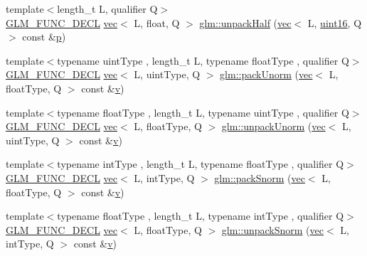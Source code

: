 \begin{DoxyCompactItemize}
\item 
{\footnotesize template$<$length\+\_\+t L, qualifier Q$>$ }\\\hyperlink{setup_8hpp_ab2d052de21a70539923e9bcbf6e83a51}{G\+L\+M\+\_\+\+F\+U\+N\+C\+\_\+\+D\+E\+CL} \hyperlink{structglm_1_1vec}{vec}$<$ L, float, Q $>$ \hyperlink{group__gtc__packing_ga30d6b2f1806315bcd6047131f547d33b}{glm\+::unpack\+Half} (\hyperlink{structglm_1_1vec}{vec}$<$ L, \hyperlink{group__gtc__type__precision_gad8c2939e1fdd8e5828b31d95c52255d5}{uint16}, Q $>$ const \&\hyperlink{_s_d_l__opengl__glext_8h_aa5367c14d90f462230c2611b81b41d23}{p})
\item 
{\footnotesize template$<$typename uint\+Type , length\+\_\+t L, typename float\+Type , qualifier Q$>$ }\\\hyperlink{setup_8hpp_ab2d052de21a70539923e9bcbf6e83a51}{G\+L\+M\+\_\+\+F\+U\+N\+C\+\_\+\+D\+E\+CL} \hyperlink{structglm_1_1vec}{vec}$<$ L, uint\+Type, Q $>$ \hyperlink{group__gtc__packing_gaccd3f27e6ba5163eb7aa9bc8ff96251a}{glm\+::pack\+Unorm} (\hyperlink{structglm_1_1vec}{vec}$<$ L, float\+Type, Q $>$ const \&\hyperlink{_s_d_l__opengl_8h_a10a82eabcb59d2fcd74acee063775f90}{v})
\item 
{\footnotesize template$<$typename float\+Type , length\+\_\+t L, typename uint\+Type , qualifier Q$>$ }\\\hyperlink{setup_8hpp_ab2d052de21a70539923e9bcbf6e83a51}{G\+L\+M\+\_\+\+F\+U\+N\+C\+\_\+\+D\+E\+CL} \hyperlink{structglm_1_1vec}{vec}$<$ L, float\+Type, Q $>$ \hyperlink{group__gtc__packing_ga3e6ac9178b59f0b1b2f7599f2183eb7f}{glm\+::unpack\+Unorm} (\hyperlink{structglm_1_1vec}{vec}$<$ L, uint\+Type, Q $>$ const \&\hyperlink{_s_d_l__opengl_8h_a10a82eabcb59d2fcd74acee063775f90}{v})
\item 
{\footnotesize template$<$typename int\+Type , length\+\_\+t L, typename float\+Type , qualifier Q$>$ }\\\hyperlink{setup_8hpp_ab2d052de21a70539923e9bcbf6e83a51}{G\+L\+M\+\_\+\+F\+U\+N\+C\+\_\+\+D\+E\+CL} \hyperlink{structglm_1_1vec}{vec}$<$ L, int\+Type, Q $>$ \hyperlink{group__gtc__packing_gaa54b5855a750d6aeb12c1c902f5939b8}{glm\+::pack\+Snorm} (\hyperlink{structglm_1_1vec}{vec}$<$ L, float\+Type, Q $>$ const \&\hyperlink{_s_d_l__opengl_8h_a10a82eabcb59d2fcd74acee063775f90}{v})
\item 
{\footnotesize template$<$typename float\+Type , length\+\_\+t L, typename int\+Type , qualifier Q$>$ }\\\hyperlink{setup_8hpp_ab2d052de21a70539923e9bcbf6e83a51}{G\+L\+M\+\_\+\+F\+U\+N\+C\+\_\+\+D\+E\+CL} \hyperlink{structglm_1_1vec}{vec}$<$ L, float\+Type, Q $>$ \hyperlink{group__gtc__packing_ga6d49b31e5c3f9df8e1f99ab62b999482}{glm\+::unpack\+Snorm} (\hyperlink{structglm_1_1vec}{vec}$<$ L, int\+Type, Q $>$ const \&\hyperlink{_s_d_l__opengl_8h_a10a82eabcb59d2fcd74acee063775f90}{v})

\end{DoxyCompactItemize}
